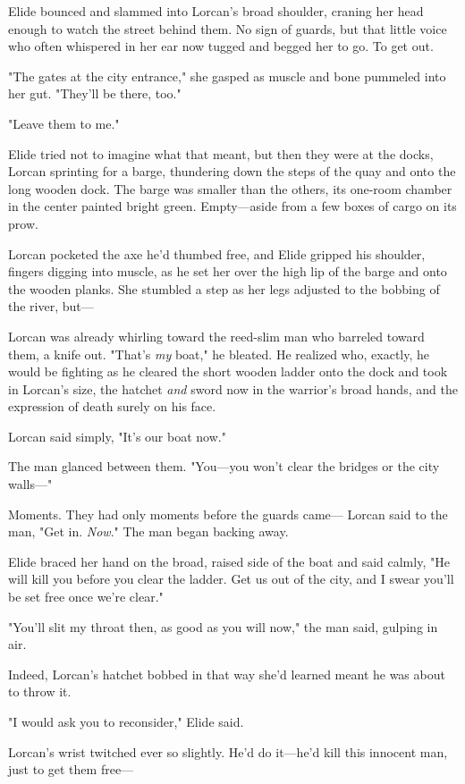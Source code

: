 Elide bounced and slammed into Lorcan's broad shoulder, craning her head enough to watch the street behind them.
No sign of guards, but 
that little voice who often whispered in her ear now tugged and begged her to go.
To get out.

"The gates at the city entrance," she gasped as muscle and bone pummeled into her gut.
"They'll be there, too."

"Leave them to me."

Elide tried not to imagine what that meant, but then they were at the docks, Lorcan sprinting for a barge, thundering down the steps of the quay and onto the long wooden dock.
The barge was smaller than the others, its one-room chamber in the center painted bright green.
Empty---aside from a few boxes of cargo on its prow.

Lorcan pocketed the axe he'd thumbed free, and Elide gripped his shoulder, fingers digging into muscle, as he set her over the high lip of the barge and onto the wooden planks.
She stumbled a step as her legs adjusted to the bobbing of the river, but---

Lorcan was already whirling toward the reed-slim man who barreled toward them, a knife out.
"That's \emph{my} boat," he bleated.
He realized who, exactly, he would be fighting as he cleared the short wooden ladder onto the dock and took in Lorcan's size, the hatchet \emph{and} sword now in the warrior's broad hands, and the expression of death surely on his face.

Lorcan said simply, "It's our boat now."

The man glanced between them.
"You---you won't clear the bridges or the city walls---"

Moments.
They had only moments before the guards came--- Lorcan said to the man, "Get in.
\emph{Now}."
The man began backing away.

Elide braced her hand on the broad, raised side of the boat and said calmly, "He will kill you before you clear the ladder.
Get us out of the city, and I swear you'll be set free once we're clear."

"You'll slit my throat then, as good as you will now," the man said, gulping in air.

Indeed, Lorcan's hatchet bobbed in that way she'd learned meant he was about to throw it.

"I would ask you to reconsider," Elide said.

Lorcan's wrist twitched ever so slightly.
He'd do it---he'd kill this innocent man, just to get them free---

